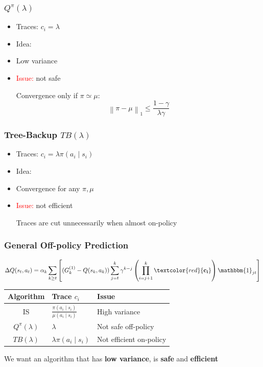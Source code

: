 \documentclass{beamer}
\newcommand{\norm}[2][\infty]{\left\|#2\right\|_{#1}}
\begin{document}
\begin{frame}
\frametitle{$Q^{\pi}(\lambda)$}
\begin{itemize}
\item Traces: $c_i = \lambda$
\item Idea: 
\item Low variance
\item \textcolor{red}{Issue:} not safe

Convergence only if $\pi\simeq\mu$:
\[
	\norm[1]{\pi-\mu} \leq \frac{1-\gamma}{\lambda\gamma}
\]
\end{itemize}
\end{frame}

\begin{frame}
\frametitle{Tree-Backup $TB(\lambda)$}
\begin{itemize}
\item Traces: $c_i = \lambda\pi(a_i\mid s_i)$
\item Idea: 
\item Convergence for any $\pi,\mu$
\item \textcolor{red}{Issue:} not efficient

Traces are cut unnecessarily when almost on-policy
\end{itemize}
\end{frame}

\begin{frame}
\frametitle{General Off-policy Prediction}
\begin{align*}
	\Delta Q(s_t,a_t) =
	\alpha_k
	\sum_{k\geq t}\left[
	(G_k^{(1)} - Q(s_k,a_k))
	\sum_{j=t}^k\gamma^{k-j}
	\left(\prod_{i=j+1}^k \textcolor{red}{\bf{c_i}}\right)
	\mathbbm{1}_{jt}
	\right]
\end{align*}

\begin{table}
\begin{tabular}{cll}
\toprule
Algorithm & Trace $c_i$ & Issue \\
\midrule
IS 					& $\frac{\pi(a_i\mid s_i)}{\mu(a_i\mid s_i)}$ 	& High variance\\
$Q^{\pi}(\lambda)$	& $\lambda$										& Not safe off-policy\\
$TB(\lambda)$		& $\lambda\pi(a_i\mid s_i)$						& Not efficient on-policy\\
\bottomrule
\end{tabular}
\end{table}
We want an algorithm that has \textbf{low variance}, is \textbf{safe} and \textbf{efficient}
\end{frame}
\end{document}
